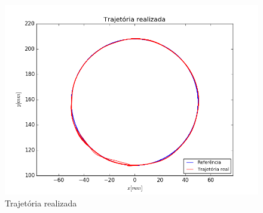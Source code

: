\documentclass[]{politex}
\begin{document}
\begin{figure}[H]
	\centering
	\includegraphics[scale=0.39]{../../../Experimental/Aquisicoes/PIDSMCx_circulo/xy.png}  
	\caption{Trajetória realizada}
	\label{fig:PIDSMCx_circulo_xy}
\end{figure}
\end{document}
